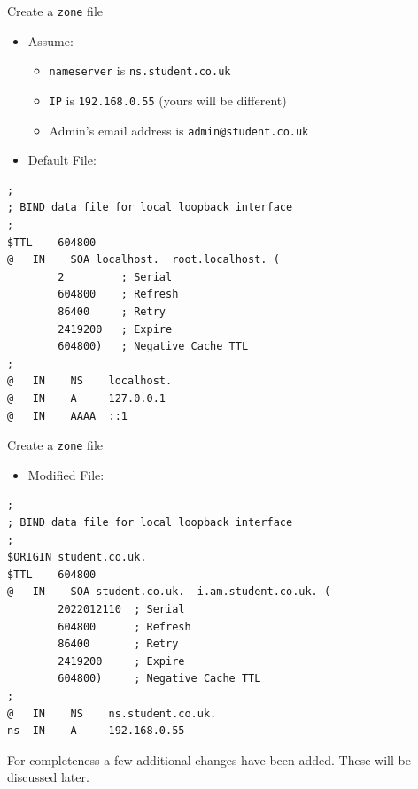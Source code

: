 \documentclass[xcolor=table]{beamer}
\begin{document}
\begin{frame}[fragile]{Create a \texttt{zone} file}
  \begin{itemize}
    \item Assume:
      \begin{itemize}
        \item \texttt{nameserver} is \texttt{ns.student.co.uk}
        \item \texttt{IP} is \texttt{192.168.0.55} (yours will be different)
        \item Admin's email address is \texttt{admin@student.co.uk}
      \end{itemize}
  \end{itemize}
  \begin{itemize}
    \item Default File:
  \end{itemize}
  \lstset{
    basicstyle=\tiny\ttfamily,
  }
  \begin{lstlisting}
;
; BIND data file for local loopback interface
;
$TTL    604800
@   IN    SOA localhost.  root.localhost. (
        2         ; Serial
        604800    ; Refresh
        86400     ; Retry
        2419200   ; Expire
        604800)   ; Negative Cache TTL
;
@   IN    NS    localhost.
@   IN    A     127.0.0.1
@   IN    AAAA  ::1
  \end{lstlisting}
\end{frame}

\begin{frame}[fragile]{Create a \texttt{zone} file}
  \begin{itemize}
    \item Modified File:
  \end{itemize}
  \lstset{
    basicstyle=\tiny\ttfamily,
  }
  \begin{lstlisting}
;
; BIND data file for local loopback interface
;
$ORIGIN student.co.uk.
$TTL    604800
@   IN    SOA student.co.uk.  i.am.student.co.uk. (
        2022012110  ; Serial
        604800      ; Refresh
        86400       ; Retry
        2419200     ; Expire
        604800)     ; Negative Cache TTL
;
@   IN    NS    ns.student.co.uk.
ns  IN    A     192.168.0.55
  \end{lstlisting}
  \begin{tcolorbox}[title={\textbf{NOTE:}}]
    For completeness a few additional changes have been added. These will be discussed later.
  \end{tcolorbox}
\end{frame}
\end{document}
